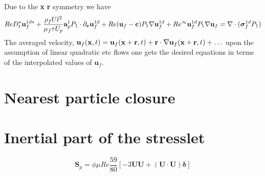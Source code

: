 Due to the \textbf{x} \textbf{r} symmetry we have 
\begin{align*}
    Re D_t^*  \textbf{u}_f^{1d*}  
    +  \frac{\rho_f U l^2 }{\mu_f \tau U_p}  \textbf{a}_p^1  P_1   \cdot \partial_\textbf{c} \textbf{u}_f^{1d} 
    + Re ( \textbf{u}_f -   \textbf{c}  ) P_1 \mathbf{\nabla} \textbf{u}_f^{1d}
    + Re^\infty \textbf{u}_f^{1d} P_1 \mathbf{\nabla}\textbf{u}_f
    = 
    \mathbf{\nabla}\cdot ( \bm\sigma_f^{1d} P_1)
\end{align*}
The averaged velocity, 
$\textbf{u}_f(\textbf{x},t) = \textbf{u}_f(\textbf{x}+ \textbf{r},t) + \textbf{r}\cdot \mathbf{\nabla} \textbf{u}_f(\textbf{x}+ \textbf{r},t)+ \ldots$ upon the assumption of linear quadratic etc flows one gets the desired equations in terms of the interpolated values of $\textbf{u}_f$. 

\section{Nearest particle closure}


\section*{Inertial part of the stresslet }

\begin{equation*}
    \textbf{S}_p 
    =
    \phi \mu Re
    \frac{59}{80} \left[
        - 3\textbf{U}\textbf{U}
        + (\textbf{U}\cdot\textbf{U})\bm\delta
    \right] 
\end{equation*}

